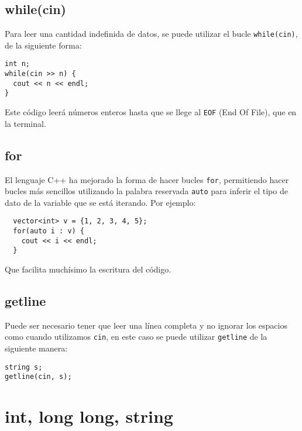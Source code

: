 \subsection{while(cin)}

Para leer una cantidad indefinida de datos, se puede utilizar el bucle \texttt{while(cin)}, de la siguiente forma:

\begin{lstlisting}
int n;
while(cin >> n) {
  cout << n << endl;
}
\end{lstlisting}

Este código leerá números enteros hasta que se llege al \texttt{EOF} (End Of File), que en la terminal.

\subsection{for}

El lenguaje C++ ha mejorado la forma de hacer bucles \texttt{for}, permitiendo hacer bucles más sencillos utilizando la
palabra reservada \texttt{auto} para inferir el tipo de dato de la variable que se está iterando. Por ejemplo:

\begin{lstlisting}
  vector<int> v = {1, 2, 3, 4, 5};
  for(auto i : v) {
    cout << i << endl;
  }
\end{lstlisting}

Que facilita muchísimo la escritura del código.


\subsection{getline}

Puede ser necesario tener que leer una línea completa y no ignorar los espacios como cuando utilizamos \texttt{cin}, en
este caso se puede utilizar \texttt{getline} de la siguiente manera:

\begin{lstlisting}
string s;
getline(cin, s);
\end{lstlisting}


\section{int, long long, string}
\label{sec:tiposdedatos}

